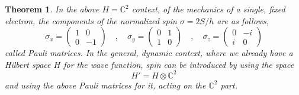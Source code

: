 \documentclass[12pt]{amsbook}
\newtheorem{theorem}{Theorem}[chapter]
\begin{document}
\begin{theorem}
In the above $H=\mathbb C^2$ context, of the mechanics of a single, fixed electron, the components of the normalized spin $\sigma=2S/h$ are as follows,
$$\sigma_x=\begin{pmatrix}1&0\\0&-1\end{pmatrix}
\quad,\quad \sigma_y=\begin{pmatrix}0&1\\1&0\end{pmatrix}
\quad,\quad \sigma_z=\begin{pmatrix}0&-i\\i&0\end{pmatrix}$$
called Pauli matrices. In the general, dynamic context, where we already have a Hilbert space $H$ for the wave function, spin can be introduced by using the space
$$H'=H\otimes\mathbb C^2$$
and using the above Pauli matrices for it, acting on the $\mathbb C^2$ part.
\end{theorem}
\end{document}
